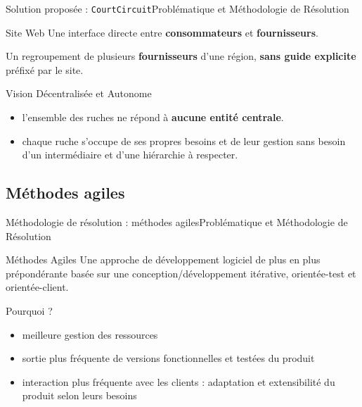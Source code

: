 \documentclass[usenames,dvipsnames]{beamer}
\begin{document}
\begin{frame}{Solution proposée : \texttt{CourtCircuit}}{Problématique et Méthodologie de Résolution}
\begin{block}{Site Web}
Une interface directe entre \textbf{consommateurs} et \textbf{fournisseurs}.
\end{block}

\begin{definition}[Ruche]
Un regroupement de plusieurs \textbf{fournisseurs} d'une région, \textbf{sans guide explicite} préfixé par le site.
\end{definition}

\begin{block}{Vision Décentralisée et Autonome}
\begin{itemize}
  \item l'ensemble des ruches ne répond à \textbf{aucune entité centrale}.
  \item chaque ruche s'occupe de ses propres besoins et de leur gestion sans besoin d'un intermédiaire et d'une hiérarchie à respecter.
\end{itemize}
\end{block}
\end{frame}

\subsection{Méthodes agiles}
\begin{frame}{Méthodologie de résolution : méthodes agiles}{Problématique et Méthodologie de Résolution}
\begin{block}{Méthodes Agiles}
Une approche de développement logiciel de plus en plus prépondérante basée sur une conception/développement itérative, orientée-test et orientée-client.
\end{block}

\begin{block}{Pourquoi ?}
\begin{itemize}
  \item meilleure gestion des ressources
  \item sortie plus fréquente de versions fonctionnelles et testées du produit
  \item interaction plus fréquente avec les clients : adaptation et extensibilité du produit selon leurs besoins
\end{itemize}
\end{block}
\end{frame}
\end{document}
